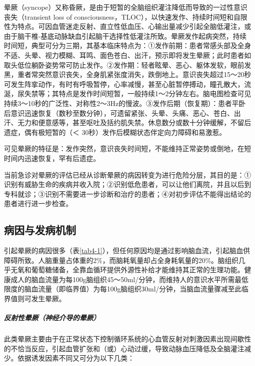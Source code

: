 晕厥（syncope）又称昏厥，是由于短暂的全脑组织灌注降低而导致的一过性意识丧失（transient
loss of
consciousness，TLOC），以快速发作、持续时间短和自限性为特点。可因血管迷走反射、直立性低血压、心输出量减少引起全脑低灌注，或由于脑干椎-基底动脉缺血引起脑干选择性低灌注所致。晕厥发作起病突然，持续时间短，典型可分为三期，其基本临床特点为：①发作前期：患者常感头部及全身不适、头晕、视力模糊、耳鸣、面色苍白、出汗，预示即将发生晕厥；此时患者如取头低位躺卧姿势常可防止发作。②发作期：轻者眩晕、恶心、躯体发软，眼前发黑，重者常突然意识丧失，全身肌紧张度消失，跌倒地上。意识丧失超过15～20秒可发生阵挛动作，有时有呼吸暂停，心率减慢，甚至心脏暂停搏动，瞳孔散大，流涎，尿失禁等；其特点是发作时间短暂，一般持续1～2分钟左右。脑电图检查可见持续3～10秒的广泛性、对称性2～3Hz的慢波。③发作后期（恢复期）：患者平卧后意识迅速恢复（数秒至数分钟），可遗留紧张、头晕、头痛、恶心、苍白、出汗、无力和便意感等，甚至呕吐及括约肌失禁。休息数分或数十分钟缓解，不留后遗症，偶有极短暂的（＜
30秒）发作后模糊状态伴定向力障碍和易激惹。

可见晕厥的特征是：发作突然，意识丧失时间短，不能维持正常姿势或倒地，在短时间内迅速恢复，罕有后遗症。

当前急诊对晕厥的评估已经从诊断晕厥的病因转变为进行危险分层，其目的是：①识别有威胁生命的疾病并收入院；②识别低危患者，可以让他们离院，并且以后到专科就诊；③识别不需要进一步诊断和治疗的患者；④对初步评估不能得出结论的患者进行进一步检查。

\subsection{病因与发病机制}

引起晕厥的病因很多（表\ref{tab4-1}），但任何原因均是通过影响脑血流，引起脑血供障碍所致。人脑重量占体重的2\%，而脑耗氧量却占全身耗氧量的20\%。脑组织几乎无氧和葡萄糖储备，全靠血循环提供外源性补给才能维持其正常的生理功能。健康成人的脑血流量为每100g脑组织45～50ml/分钟，而维持人的意识水平所需最低限度的脑血流量（即临界值）为每100g脑组织30ml/分钟，当脑血流量骤减至此临界值则可发生晕厥。

\subparagraph{反射性晕厥（神经介导的晕厥）}

此类晕厥主要由于在正常状态下控制循环系统的心血管反射对刺激因素出现间歇性的不恰当反应，引起血管扩张和（或）心动过缓，导致动脉血压降低及全脑灌注减少。依据诱发因素不同又可分为以下几类：

